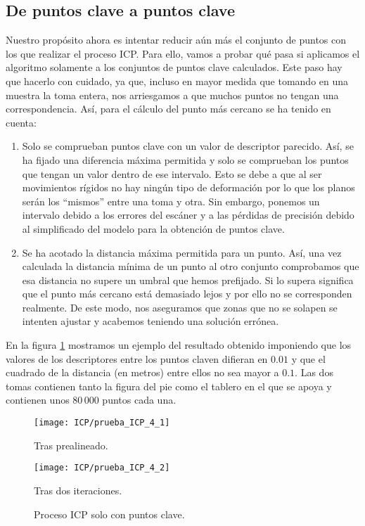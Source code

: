 \subsection{De puntos clave a puntos clave}
Nuestro propósito ahora es intentar reducir aún más el conjunto de puntos con los que realizar el proceso ICP. Para ello, vamos a probar qué pasa si aplicamos el algoritmo solamente a los conjuntos de puntos clave calculados. Este paso hay que hacerlo con cuidado, ya que, incluso en mayor medida que tomando en una muestra la toma entera, nos arriesgamos a que muchos puntos no tengan una correspondencia. Así, para el cálculo del punto más cercano se ha tenido en cuenta: 

\begin{enumerate}
\item Solo se comprueban puntos clave con un valor de descriptor parecido. Así, se ha fijado una diferencia máxima permitida y solo se comprueban los puntos que tengan un valor dentro de ese intervalo. Esto se debe a que al ser movimientos rígidos no hay ningún tipo de deformación por lo que los planos serán los ``mismos'' entre una toma y otra. Sin embargo, ponemos un intervalo debido a los errores del escáner y a las pérdidas de precisión debido al simplificado del modelo para la obtención de puntos clave.
\item Se ha acotado la distancia máxima permitida para un punto. Así, una vez calculada la distancia mínima de un punto al otro conjunto comprobamos que esa distancia no supere un umbral que hemos prefijado. Si lo supera significa que el punto más cercano está demasiado lejos y por ello no se corresponden realmente. De este modo, nos aseguramos que zonas que no se solapen se intenten ajustar y acabemos teniendo una solución errónea. 
\end{enumerate}

En la figura \ref{fig:KPKPICP} mostramos un ejemplo del resultado obtenido imponiendo que los valores de los descriptores entre los puntos claven difieran en $ 0.01 $ y que el cuadrado de la distancia (en metros) entre ellos no sea mayor a $ 0.1 $. Las dos tomas contienen tanto la figura del pie como el tablero en el que se apoya y contienen unos $ 80\,000 $ puntos cada una.\\

\begin{figure}[h!]
	
	\begin{minipage}[b]{0.5\textwidth}
		\centering
		\texttt{[image: ICP/prueba\_ICP\_4\_1]} 
		\caption*{Tras prealineado.}
	\end{minipage}
	\begin{minipage}[b]{0.5\textwidth}
		\centering
		\texttt{[image: ICP/prueba\_ICP\_4\_2]}
		\caption*{Tras dos iteraciones.}
	\end{minipage}
	\caption{Proceso ICP solo con puntos clave.}
	\label{fig:KPKPICP}
\end{figure}

